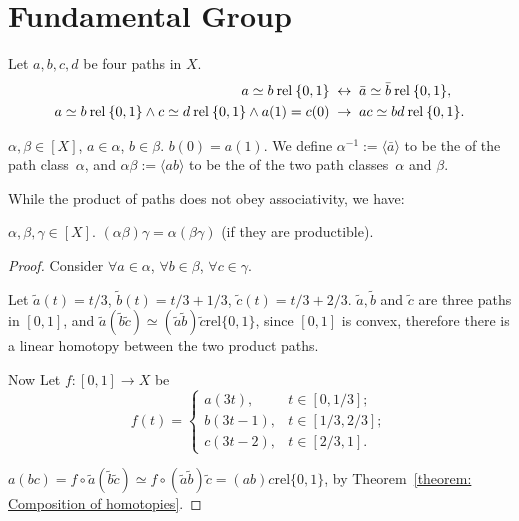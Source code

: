 \documentclass[openany]{book}
\newcommand*{\rel}{\mathbin{\mathrm{rel}}}
\begin{document}
\section{Fundamental Group}

\begin{theorem}
    Let $a, b, c, d$ be four paths in $X$.
    \begin{align*}
        a \simeq b \rel \{0, 1\} &\IFF \bar a \simeq \bar b \rel \{0, 1\}, \\
        a \simeq b \rel \{0, 1\} \wedge c \simeq d \rel \{0, 1\} \wedge a(1) = c(0) &\then ac \simeq bd \rel \{0, 1\}.
    \end{align*}
\end{theorem}

\begin{definition}
    $\alpha, \beta \in [X]$, $a \in \alpha$, $b \in \beta$.
    $b(0) = a(1)$.
    We define $\alpha^{-1} := \langle \bar a \rangle$ to be the  of the path class~$\alpha$, and $\alpha \beta := \langle ab \rangle$ to be the  of the two path classes~$\alpha$ and $\beta$.
\end{definition}

While the product of paths does not obey associativity, we have:
\begin{theorem}%
    \label{theorem: Associativity of product of path classes}
    $\alpha, \beta, \gamma \in [X]$. $(\alpha \beta) \gamma = \alpha (\beta \gamma)$ (if they are productible).
\end{theorem}
\begin{proof}
    Consider $\forall a \in \alpha$, $\forall b \in \beta$, $\forall c \in \gamma$.

    Let $\tilde a(t) = t/3$, $\tilde b(t) = t/3 + 1/3$, $\tilde c(t) = t/3 + 2/3$. 
    $\tilde a, \tilde b$ and $\tilde c$ are three paths in $[0, 1]$, and $\tilde a (\tilde b \tilde c) \simeq (\tilde a \tilde b) \tilde c \rel \{0, 1\}$, since $[0, 1]$ is convex, therefore there is a linear homotopy between the two product paths.

    Now Let $f \colon [0, 1] \to X$ be
    \begin{equation*}
        f(t) = \begin{cases}
            a(3t), & t \in [0, 1/3]; \\
            b(3t - 1), & t \in [1/3, 2/3]; \\
            c(3t - 2), & t \in [2/3, 1].
        \end{cases}
    \end{equation*}

    $a(bc) = f \circ \tilde a (\tilde b \tilde c) \simeq f \circ (\tilde a \tilde b) \tilde c = (ab)c \rel \{0, 1\}$, by Theorem~\ref{theorem: Composition of homotopies}.
\end{proof}
\end{document}
